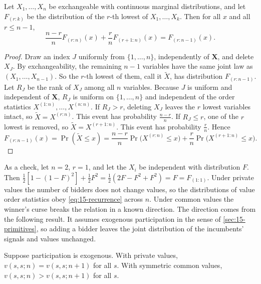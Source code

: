 \begin{lemma}\label{lem:15-recurrence}
Let $X_1,\dots,X_n$ be exchangeable with continuous marginal distributions, and let $F_{(r:k)}$ be the
distribution of the $r$-th lowest of $X_1,\dots,X_k$. Then for all $x$ and all $r\le n-1$,
\begin{equation}\label{eq:15-recurrence}
  \frac{n-r}{n}F_{(r:n)}(x)+\frac{r}{n}F_{(r+1:n)}(x)=F_{(r:n-1)}(x).
\end{equation}
\end{lemma}

\begin{proof}
Draw an index $J$ uniformly from $\{1,\dots,n\}$, independently of $\bm X$, and delete $X_J$. By
exchangeability, the remaining $n-1$ variables have the same joint law as $(X_1,\dots,X_{n-1})$. So the $r$-th
lowest of them, call it $\tilde X$, has distribution $F_{(r:n-1)}$. Let $R_J$ be the rank of $X_J$ among all
$n$ variables. Because $J$ is uniform and independent of $\bm X$, $R_J$ is uniform on $\{1,\dots,n\}$ and
independent of the order statistics $X^{(1:n)},\dots,X^{(n:n)}$. If $R_J>r$, deleting $X_J$ leaves the $r$
lowest variables intact, so $\tilde X=X^{(r:n)}$. This event has probability $\frac{n-r}{n}$. If $R_J\le r$,
one of the $r$ lowest is removed, so $\tilde X=X^{(r+1:n)}$. This event has probability $\frac rn$. Hence
\begin{equation*}
  F_{(r:n-1)}(x)=\Pr(\tilde X\le x)
  =\frac{n-r}{n}\Pr\bigl(X^{(r:n)}\le x\bigr)+\frac rn\Pr\bigl(X^{(r+1:n)}\le x\bigr).
\end{equation*}
\end{proof}

As a check, let $n=2$, $r=1$, and let the $X_i$ be independent with distribution $F$. Then
$\frac12[1-(1-F)^2]+\frac12F^2=\frac12(2F-F^2+F^2)=F=F_{(1:1)}$. Under private values the number of bidders
does not change values, so the distributions of value order statistics obey \eqref{eq:15-recurrence} across
$n$. Under common values the winner's curse breaks the relation in a known direction. The direction comes from
the following result. It assumes exogenous participation in the sense of \cref{sec:15-primitives}, so adding a
bidder leaves the joint distribution of the incumbents' signals and values unchanged.

\begin{lemma}\label{lem:15-pivotal-n}
Suppose participation is exogenous. With private values, $v(s,s;n)=v(s,s;n+1)$ for all $s$. With symmetric
common values, $v(s,s;n)>v(s,s;n+1)$ for all $s$.
\end{lemma}

